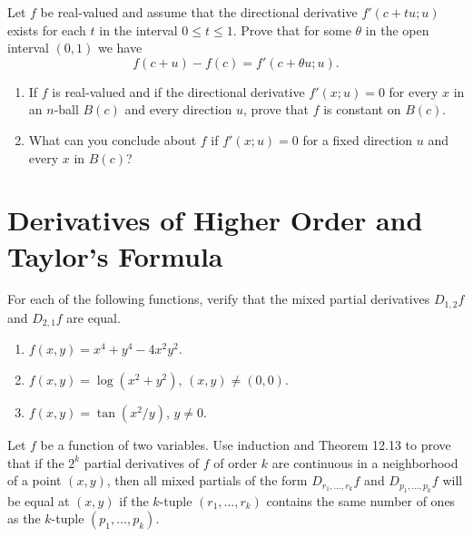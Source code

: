 \begin{problembox}
Let \( f \) be real-valued and assume that the directional derivative \( f'(c + tu; u) \) exists for each \( t \) in the interval \( 0 \leq t \leq 1 \). Prove that for some \( \theta \) in the open interval \( (0, 1) \) we have
\[f(c + u) - f(c) = f'(c + \theta u; u).\]
\end{problembox}

\begin{problembox}
\begin{enumerate}[label=(\alph*)]
\item If \( f \) is real-valued and if the directional derivative \( f'(x; u) = 0 \) for every \( x \) in an \( n \)-ball \( B(c) \) and every direction \( u \), prove that \( f \) is constant on \( B(c) \).
\item What can you conclude about \( f \) if \( f'(x; u) = 0 \) for a fixed direction \( u \) and every \( x \) in \( B(c) \)?
\end{enumerate}
\end{problembox}

\section{Derivatives of Higher Order and Taylor's Formula}

\begin{problembox}
For each of the following functions, verify that the mixed partial derivatives \( D_{1,2}f \) and \( D_{2,1}f \) are equal.
\begin{enumerate}[label=(\alph*)]
\item \( f(x, y) = x^4 + y^4 - 4x^2y^2 \).
\item \( f(x, y) = \log (x^2 + y^2) \), \( (x, y) \neq (0, 0) \).
\item \( f(x, y) = \tan (x^2/y) \), \( y \neq 0 \).
\end{enumerate}
\end{problembox}

\begin{problembox}
Let \( f \) be a function of two variables. Use induction and Theorem 12.13 to prove that if the \( 2^k \) partial derivatives of \( f \) of order \( k \) are continuous in a neighborhood of a point \( (x, y) \), then all mixed partials of the form \( D_{r_1, \ldots, r_k} f \) and \( D_{p_1, \ldots, p_k} f \) will be equal at \( (x, y) \) if the \( k \)-tuple \( (r_1, \ldots, r_k) \) contains the same number of ones as the \( k \)-tuple \( (p_1, \ldots, p_k) \).
\end{problembox}

